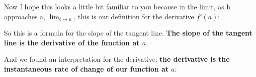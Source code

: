 \documentclass[pdftex, brazil, 12pt, twoside]{article}
\begin{document}
\begin{figure}[H]
  \begin{center}
  \end{center}
\end{figure}

Now I hope this looks a little bit familiar to you
because in the limit, as b approaches a, $\displaystyle \lim_{b \to a}$,
this is our definition for the derivative $f'(a)$:

\begin{figure}[H]
  \begin{center}
  \end{center}
\end{figure}

So this is a formula for the slope of the tangent line.
\textbf{The slope of the tangent line is the derivative
of the function at $a$}.

And we found an interpretation for the derivative:
\textbf{the derivative is the instantaneous rate of change of our
  function at $a$}:
\end{document}
